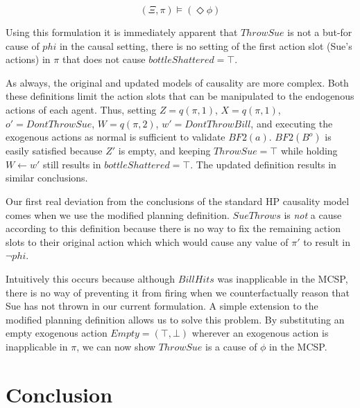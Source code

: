 \documentclass{article}
\theoremstyle{plain}
\theoremstyle{definition}
\begin{document}
\[
(\Xi, \pi) \models (\Diamond \phi)
\]

Using this formulation it is immediately apparent that $ThrowSue$ is not a but-for cause of $phi$ in the causal setting, there is no setting of the first action slot (Sue's actions) in $\pi$ that does not cause $bottleShattered=\top$.

As always, the original and updated models of causality are more complex. Both these definitions limit the action slots that can be manipulated to the endogenous actions of each agent. Thus, setting $Z=q(\pi,1)$, $X=q(\pi,1)$, $o'=DontThrowSue$, $W=q(\pi,2)$, $w'=DontThrowBill$, and executing the exogenous actions as normal is sufficient to validate $BF2(a)$. $BF2(B^o)$ is easily satisfied because $Z'$ is empty, and keeping $ThrowSue=\top$ while holding $W\leftarrow w'$ still results in $bottleShattered=\top$. The updated definition results in similar conclusions.

Our first real deviation from the conclusions of the standard HP causality model comes when we use the modified planning definition. $SueThrows$ is \textit{not} a cause according to this definition because there is no way to fix the remaining action slots to their original action which which would cause any value of $\pi'$ to result in $\lnot phi$.

Intuitively this occurs because although $BillHits$ was inapplicable in the MCSP, there is no way of preventing it from firing when we counterfactually reason that Sue has not thrown in our current formulation. A simple extension to the modified planning definition allows us to solve this problem. By substituting an empty exogenous action $Empty=(\top, \bot)$ wherever an exogenous action is inapplicable in $\pi$, we can now show $ThrowSue$ is a cause of $\phi$ in the MCSP.

\section{Conclusion}








 

\end{document}
